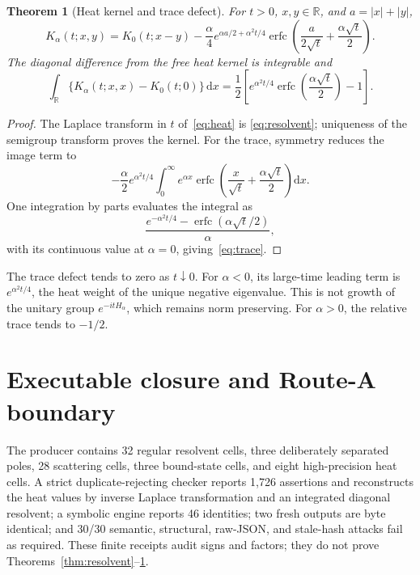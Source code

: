\documentclass[10pt]{article}
\newtheorem{theorem}{Theorem}
\newcommand{\R}{\mathbb R}
\newcommand{\D}{\mathrm d}
\newcommand{\erfc}{\operatorname{erfc}}
\begin{document}
\begin{theorem}[Heat kernel and trace defect]\label{thm:heat}
For $t>0$, $x,y\in\R$, and $a=|x|+|y|$,
\begin{equation}\label{eq:heat}
 K_\alpha(t;x,y)=K_0(t;x-y)-\frac\alpha4
 e^{\alpha a/2+\alpha^2t/4}
 \erfc\!\left(\frac{a}{2\sqrt t}+\frac{\alpha\sqrt t}{2}\right).
\end{equation}
The diagonal difference from the free heat kernel is integrable and
\begin{equation}\label{eq:trace}
 \int_\R\{K_\alpha(t;x,x)-K_0(t;0)\}\,\D x
 =\frac12\left[e^{\alpha^2t/4}
 \erfc\!\left(\frac{\alpha\sqrt t}{2}\right)-1\right].
\end{equation}
\end{theorem}
\begin{proof}
The Laplace transform in $t$ of~\eqref{eq:heat} is
\eqref{eq:resolvent}; uniqueness of the semigroup transform proves the kernel.
For the trace, symmetry reduces the image term to
\[
 -\frac\alpha2e^{\alpha^2t/4}
 \int_0^\infty e^{\alpha x}
 \erfc\!\left(\frac{x}{\sqrt t}+\frac{\alpha\sqrt t}{2}\right)\D x.
\]
One integration by parts evaluates the integral as
\[
 \frac{e^{-\alpha^2t/4}-
 \erfc(\alpha\sqrt t/2)}{\alpha},
\]
with its continuous value at $\alpha=0$, giving~\eqref{eq:trace}.
\end{proof}

The trace defect tends to zero as $t\downarrow0$.  For $\alpha<0$, its
large-time leading term is $e^{\alpha^2t/4}$, the heat weight of the unique
negative eigenvalue.  This is not growth of the unitary group
$e^{-itH_\alpha}$, which remains norm preserving.  For $\alpha>0$, the
relative trace tends to $-1/2$.

\section{Executable closure and Route-A boundary}
The producer contains 32 regular resolvent cells, three deliberately
separated poles, 28 scattering cells, three bound-state cells, and eight
high-precision heat cells.  A strict duplicate-rejecting checker reports
1,726 assertions and reconstructs the heat values by inverse Laplace
transformation and an integrated diagonal resolvent; a symbolic engine
reports 46 identities; two fresh outputs are byte identical; and 30/30
semantic, structural, raw-JSON, and stale-hash attacks fail as required.
These finite receipts audit signs and factors; they do not prove
Theorems~\ref{thm:resolvent}--\ref{thm:heat}.
\end{document}
